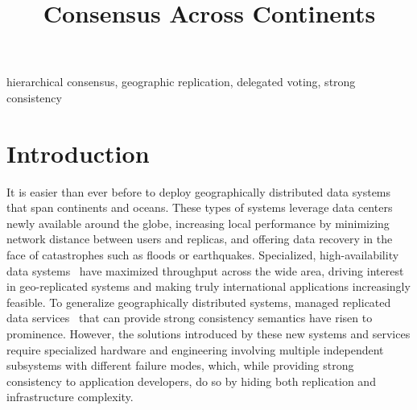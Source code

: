 \documentclass[11pt,conference]{IEEEtran}
\begin{document}
\title{Consensus Across Continents}

\author{
}

\maketitle

\begin{abstract}
    
\end{abstract}

\begin{IEEEkeywords}
hierarchical consensus, geographic replication, delegated voting, strong consistency
\end{IEEEkeywords}

\section{Introduction}

It is easier than ever before to deploy geographically distributed data systems
that span continents and oceans.
These types of systems leverage data centers newly available around the globe,
increasing local performance by minimizing network distance between users and
replicas, and offering data recovery in the face of catastrophes such as floods or
earthquakes.
Specialized, high-availability data systems~\cite{megastore,tao,akkio,dynamic_placement}
have maximized throughput across the wide area, driving interest in
geo-replicated systems and making truly international applications increasingly
feasible.
To generalize geographically distributed systems, managed replicated data
services~\cite{spanner,aurora,cockroachdb} that can provide strong consistency semantics
have risen to prominence.
However, the solutions introduced by these new systems and services require specialized
hardware and engineering involving multiple independent subsystems with different
failure modes, which, while providing strong consistency to application developers, do
so by hiding both replication and infrastructure complexity.
\end{document}

